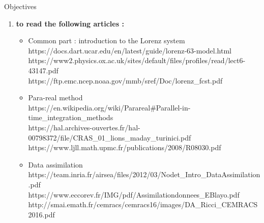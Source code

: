 \documentclass[10pt,xcolor={table,dvipsnames},t]{beamer}
\begin{document}
	\begin{frame}[allowframebreaks]{Objectives}
		
		\begin{enumerate}[\textbullet]
			\item \textbf{to read the following articles :}
			\begin{itemize}
				\item Common part : introduction to the Lorenz system \\
				\quad https://docs.dart.ucar.edu/en/latest/guide/lorenz-63-model.html \\
				\quad https://www2.physics.ox.ac.uk/sites/default/files/profiles/read/lect6-43147.pdf \\
				\quad https://ftp.emc.ncep.noaa.gov/mmb/sref/Doc/lorenz\_fcst.pdf
				\item Para-real method \\
				\quad https://en.wikipedia.org/wiki/Parareal\#Parallel-in-time\_integration\_methods \\
				\quad https://hal.archives-ouvertes.fr/hal-00798372/file/CRAS\_01\_lions\_maday\_turinici.pdf \\
				\quad https://www.ljll.math.upmc.fr/publications/2008/R08030.pdf
				\item Data assimilation \\
				\quad https://team.inria.fr/airsea/files/2012/03/Nodet\_Intro\_DataAssimilation.pdf \\
				\quad https://www.eccorev.fr/IMG/pdf/Assimilationdonnees\_EBlayo.pdf \\
				\quad
				http://smai.emath.fr/cemracs/cemracs16/images/DA\_Ricci\_CEMRACS2016.pdf
			\end{itemize}
		\end{enumerate}	 	
	
		\newpage
		
		\newpage


\end{frame}
\end{document}
